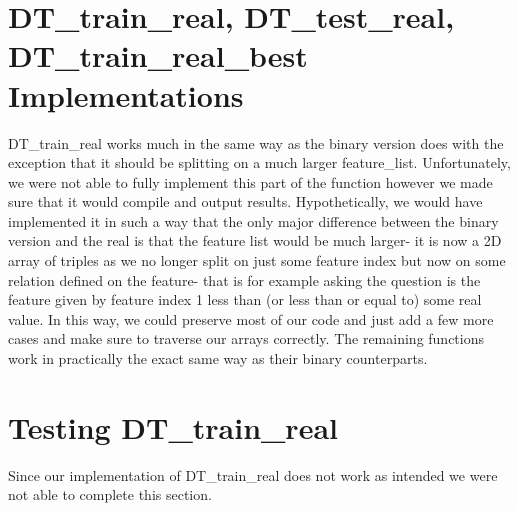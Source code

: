 \documentclass{article}
\begin{document}
\section{DT\_train\_real, DT\_test\_real, DT\_train\_real\_best Implementations}
    DT\_train\_real works much in the same way as the binary version does with the exception that it should be splitting on a much larger feature\_list. Unfortunately, we were not able to fully implement this part
    of the function however we made sure that it would compile and output results. Hypothetically, we would have implemented it in such a way that the only major difference between the binary version and the real
    is that the feature list would be much larger- it is now a 2D array of triples as we no longer split on just some feature index but now on some relation defined on the feature- that is for example asking the question
    is the feature given by feature index 1 less than (or less than or equal to) some real value. In this way, we could preserve most of our code and just add a few more cases and make sure to traverse our arrays correctly. The
    remaining functions work in practically the exact same way as their binary counterparts.
\section{Testing DT\_train\_real}
    Since our implementation of DT\_train\_real does not work as intended we were not able to complete this section.
\end{document}
